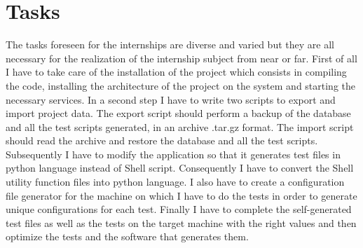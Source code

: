 \section{Tasks}
The tasks foreseen for the internships are diverse and varied but they
are all necessary for the realization of the internship subject from near or far.
\newline
\newline
First of all I have to take care of the installation of the project which 
consists in compiling the code, installing the architecture of the
project on the system and starting the necessary services.
\newline
\newline
In a second step I have to write two scripts to export and import project data.
The export script should perform a backup of the database and  all the test scripts
generated, in an archive .tar.gz format. The import script should read the archive
and restore the database and all the test scripts.
\newline
\newline
Subsequently I have to modify the application so that it generates test files
in python language instead of Shell script. Consequently I have to convert the Shell
utility function files  into python language.
\newline
\newline
I also have to create a configuration file generator for the machine on which I have to
do the tests in order to generate unique configurations for each test.
\newline
\newline
Finally I have to complete the self-generated test files as well as the tests on the target
machine with the right values and then optimize the tests and the software that generates them.